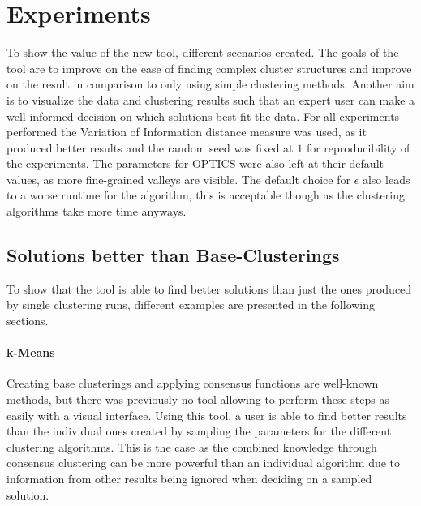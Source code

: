 \documentclass[
	a4paper,
	english,
	twoside,
	openright,               
	11pt                            
	]{report}
\begin{document}
\chapter{Experiments}\label{cha:experiments}
To show the value of the new tool, different scenarios created. The goals of the tool are to improve on the ease of finding complex cluster structures and improve on the result in comparison to only using simple clustering methods. Another aim is to visualize the data and clustering results such that an expert user can make a well-informed decision on which solutions best fit the data. For all experiments performed the Variation of Information distance measure was used, as it produced better results and the random seed was fixed at $1$ for reproducibility of the experiments. The parameters for OPTICS were also left at their default values, as more fine-grained valleys are visible. The default choice for $\epsilon$ also leads to a worse runtime for the algorithm, this is acceptable though as the clustering algorithms take more time anyways.

\section{Solutions better than Base-Clusterings}
To show that the tool is able to find better solutions than just the ones produced by single clustering runs, different examples are presented in the following sections. 
\subsubsection{k-Means}
Creating base clusterings and applying consensus functions are well-known methods, but there was previously no tool allowing to perform these steps as easily with a visual interface. Using this tool, a user is able to find better results than the individual ones created by sampling the parameters for the different clustering algorithms. This is the case as the combined knowledge through consensus clustering can be more powerful than an individual algorithm due to information from other results being ignored when deciding on a sampled solution.
\end{document}
